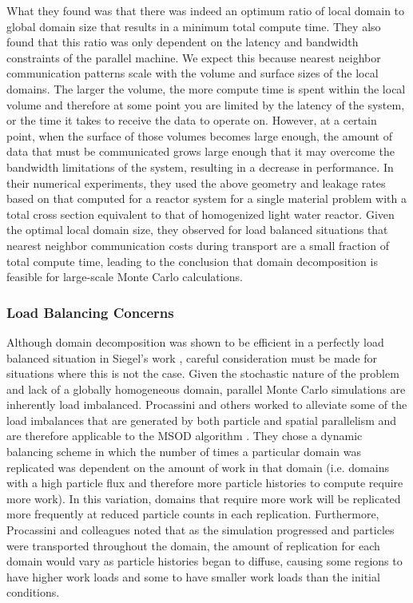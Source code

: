 What they found was that there was indeed an optimum ratio of local
domain to global domain size that results in a minimum total compute
time. They also found that this ratio was only dependent on the
latency and bandwidth constraints of the parallel machine. We expect
this because nearest neighbor communication patterns scale with the
volume and surface sizes of the local domains. The larger the volume,
the more compute time is spent within the local volume and therefore
at some point you are limited by the latency of the system, or the
time it takes to receive the data to operate on. However, at a certain
point, when the surface of those volumes becomes large enough, the
amount of data that must be communicated grows large enough that it
may overcome the bandwidth limitations of the system, resulting in a
decrease in performance. In their numerical experiments, they used the
above geometry and leakage rates based on that computed for a reactor
system for a single material problem with a total cross section
equivalent to that of homogenized light water reactor. Given the
optimal local domain size, they observed for load balanced situations
that nearest neighbor communication costs during transport are a small
fraction of total compute time, leading to the conclusion that domain
decomposition is feasible for large-scale Monte Carlo calculations.

\subsubsection{Load Balancing Concerns}
\label{subsubsec:mc_load_balancing}
Although domain decomposition was shown to be efficient in a perfectly
load balanced situation in Siegel's work \citep{siegel_analysis_2012},
careful consideration must be made for situations where this is not
the case. Given the stochastic nature of the problem and lack of a
globally homogeneous domain, parallel Monte Carlo simulations are
inherently load imbalanced. Procassini and others worked to alleviate
some of the load imbalances that are generated by both particle and
spatial parallelism and are therefore applicable to the MSOD algorithm
\citep{procassini_dynamic_2005}. They chose a dynamic balancing scheme
in which the number of times a particular domain was replicated was
dependent on the amount of work in that domain (i.e. domains with a
high particle flux and therefore more particle histories to compute
require more work). In this variation, domains that require more work
will be replicated more frequently at reduced particle counts in each
replication. Furthermore, Procassini and colleagues noted that as the
simulation progressed and particles were transported throughout the
domain, the amount of replication for each domain would vary as
particle histories began to diffuse, causing some regions to have
higher work loads and some to have smaller work loads than the initial
conditions.

